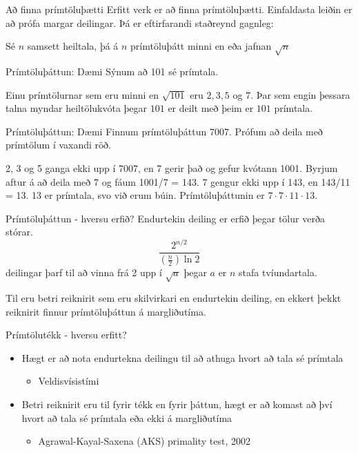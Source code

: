 \documentclass[handout]{beamer}
\begin{document}
\begin{frame}{Að finna prímtöluþætti}
Erfitt verk er að finna prímtöluþætti. Einfaldasta leiðin er að prófa margar deilingar. Þá er eftirfarandi staðreynd gagnleg:
\begin{tcolorbox}
Sé $n$ samsett heiltala, þá á $n$ prímtöluþátt minni en eða jafnan $\sqrt{n}$
\end{tcolorbox}
\end{frame}

\begin{frame}{Prímtöluþáttun: Dæmi}
Sýnum að 101 sé prímtala.

Einu prímtölurnar sem eru minni en $\sqrt{101}$ eru $2, 3, 5$ og $7$. Þar sem engin þessara talna myndar heiltölukvóta þegar $101$ er deilt með þeim er $101$ prímtala.
\end{frame}

\begin{frame}{Prímtöluþáttun: Dæmi}
Finnum prímtöluþáttun 7007. Prófum að deila með prímtölum í vaxandi röð.

2, 3 og 5 ganga ekki upp í 7007, en 7 gerir það og gefur kvótann 1001. Byrjum aftur á að deila með 7 og fáum 1001/7 = 143. 7 gengur ekki upp í 143, en 143/11 = 13. 13 er prímtala, svo við erum búin. Prímtöluþáttunin er $7 \cdot 7 \cdot 11 \cdot 13$.
\end{frame}

\begin{frame}{Prímtöluþáttun - hversu erfið?}
    Endurtekin deiling er erfið þegar tölur verða stórar.
    \[
        \frac{2^{n/2}}{\left(\frac{n}{2}\right)\ln 2}
    \]
    deilingar þarf til að vinna frá 2 upp í $\sqrt{a}$ þegar $a$ er $n$ stafa tvíundartala.

    Til eru betri reiknirit sem eru skilvirkari en endurtekin deiling, en ekkert þekkt reiknirit finnur prímtöluþáttun á margliðutíma.
\end{frame}

\begin{frame}{Prímtölutékk - hversu erfitt?}
\begin{itemize}
 \item Hægt er að nota endurtekna deilingu til að athuga hvort að tala sé prímtala
 \begin{itemize}
  \item Veldisvísistími
 \end{itemize}
 \item Betri reiknirit eru til fyrir tékk en fyrir þáttun, hægt er að komast að því hvort að tala sé prímtala eða ekki á margliðutíma
 \begin{itemize}
  \item Agrawal-Kayal-Saxena (AKS) primality test, 2002
 \end{itemize}
\end{itemize}
\end{frame}
\end{document}
